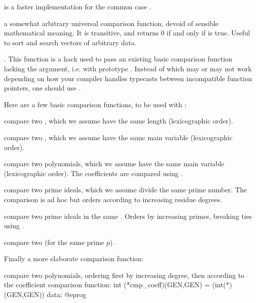  is a faster
implementation for the common case .


 a somewhat arbitrary universal
comparison function, devoid of sensible mathematical meaning. It is
transitive, and returns 0 if and only if  is true.
Useful to sort and search vectors of arbitrary data.

. This function is a hack
used to pass an existing basic comparison function lacking the 
argument, i.e. with prototype . Instead of
 which may or may not work depending on how your
compiler handles typecasts between incompatible function pointers, one should
use .

Here are a few basic comparison functions, to be used with :

 compare two , which we assume have
the same length (lexicographic order).

 compare two , which we assume
have the same main variable (lexicographic order).

 compare two polynomials, which we assume
have the same main variable (lexicographic order). The coefficients are
compared using .

 compare two prime ideals, which
we assume divide the same prime number. The comparison is ad hoc but orders
according to increasing residue degrees.

 compare two prime ideals in the same
. Orders by increasing primes, breaking ties using
.

 compare two  (for the same
prime $p$).

Finally a more elaborate comparison function:

 compare two polynomials,
ordering first by increasing degree, then according to the coefficient
comparison function:
\bprog
  int (*cmp_coeff)(GEN,GEN) = (int(*)(GEN,GEN)) data;
@eprog

